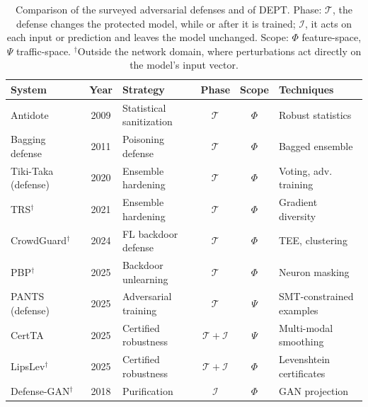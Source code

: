 \begin{table}[htbp]
    \centering
    \caption[Comparison of the surveyed adversarial defenses.]{Comparison of the
    surveyed adversarial defenses and of DEPT. Phase: $\mathcal{T}$, the defense changes
    the protected model, while or after it is trained; $\mathcal{I}$, it acts on each input
    or prediction and leaves the model unchanged. Scope: $\Phi$ feature-space,
    $\Psi$ traffic-space. $^\dagger$Outside the network domain, where perturbations act
    directly on the model's input vector.}
    \label{tab:rel-comparison}
    \footnotesize
    \begin{tabular}{@{}lclccl@{}}
        \toprule
        \textbf{System} & \textbf{Year} & \textbf{Strategy} & \textbf{Phase} & \textbf{Scope} & \textbf{Techniques} \\
        \midrule
        Antidote~\cite{rubinstein2009antidote}      & 2009 & Statistical sanitization & $\mathcal{T}$ & $\Phi$ & Robust statistics \\
        Bagging defense~\cite{biggio2011bagging,chen2022collective} & 2011 & Poisoning defense & $\mathcal{T}$ & $\Phi$ & Bagged ensemble \\
        Tiki-Taka (defense)~\cite{zhang2020tiki}    & 2020 & Ensemble hardening       & $\mathcal{T}$ & $\Phi$ & Voting, adv. training \\
        TRS$^\dagger$~\cite{yang2021trs}            & 2021 & Ensemble hardening       & $\mathcal{T}$ & $\Phi$ & Gradient diversity \\
        CrowdGuard$^\dagger$~\cite{rieger2024crowdguard} & 2024 & FL backdoor defense & $\mathcal{T}$ & $\Phi$ & TEE, clustering \\
        PBP$^\dagger$~\cite{nguyen2025pbp}          & 2025 & Backdoor unlearning      & $\mathcal{T}$ & $\Phi$ & Neuron masking \\
        PANTS (defense)~\cite{jin2025robustifying}  & 2025 & Adversarial training     & $\mathcal{T}$ & $\Psi$ & SMT-constrained examples \\
        CertTA~\cite{yan2025certta}                 & 2025 & Certified robustness     & $\mathcal{T} + \mathcal{I}$ & $\Psi$ & Multi-modal smoothing \\
        LipsLev$^\dagger$~\cite{abad2025lipslev}    & 2025 & Certified robustness     & $\mathcal{T} + \mathcal{I}$ & $\Phi$ & Levenshtein certificates \\
        Defense-GAN$^\dagger$~\cite{samangouei2018defense} & 2018 & Purification      & $\mathcal{I}$ & $\Phi$ & GAN projection \\

\end{tabular}
\end{table}
